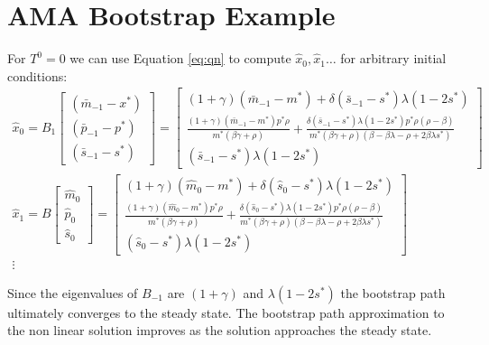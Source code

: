 \documentclass[12pt]{article}
\begin{document}
\section{AMA Bootstrap Example}
\label{sec:contExample}
\label{sec:exampleAimBoot}


For $T^0=0$ we can use Equation \ref{eq:qn} to compute $\hat{x}_0,\hat{x}_1\ldots$ for arbitrary
initial conditions:
\begin{gather*}
\hat{x}_0=B_1
\begin{bmatrix}
  (\bar{m}_{-1}-x^\ast)\\ (\bar{p}_{-1}-p^\ast)\\ (\bar{s}_{-1}-s^\ast)
\end{bmatrix} = 
\begin{bmatrix}
  (1 + \gamma)(\bar{m}_{-1}-m^\ast) + \delta (\bar{s}_{-1}-s^\ast) \lambda (1 - 2 s^\ast)\\
\frac{(1 + \gamma)(\bar{m}_{-1}-m^\ast) p^\ast \rho}{m^\ast(\beta \gamma + \rho)} + 
\frac{\delta(\bar{s}_{-1}-s^\ast)\lambda (1 - 2 s^\ast)p^\ast \rho(\rho - \beta) }{m^\ast(\beta\gamma + \rho)(\beta - \beta\lambda - \rho + 2 \beta\lambda s^\ast)}\\
(\bar{s}_{-1}-s^\ast) \lambda (1 - 2 s^\ast)
\end{bmatrix}\\
\hat{x}_1=B 
\begin{bmatrix}
  \hat{m}_{0}\\ \hat{p}_{0}\\ \hat{s}_{0}
\end{bmatrix} = 
\begin{bmatrix}
  (1 + \gamma)(\hat{m}_{0}-m^\ast) + \delta (\hat{s}_{0}-s^\ast) \lambda (1 - 2 s^\ast)\\
\frac{(1 + \gamma)(\hat{m}_{0}-m^\ast) p^\ast \rho}{m^\ast(\beta \gamma + \rho)} + 
\frac{\delta(\hat{s}_{0}-s^\ast)\lambda (1 - 2 s^\ast)p^\ast \rho(\rho - \beta) }{m^\ast(\beta\gamma + \rho)(\beta - \beta\lambda - \rho + 2 \beta\lambda s^\ast)}\\
(\hat{s}_{0}-s^\ast) \lambda (1 - 2 s^\ast)
\end{bmatrix}\\ \vdots
\end{gather*}

Since the eigenvalues of $B_{-1}$ are $(1 + \gamma)$ and $\lambda(1- 2 s^\ast)$
the bootstrap path ultimately converges to the steady state.
The bootstrap path  approximation to the non linear solution improves 
as the solution approaches  the
steady state.
\end{document}
